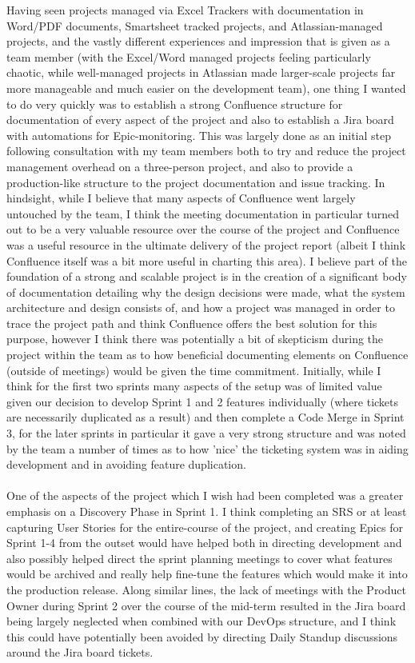 \documentclass{scrreprt}
\begin{document}
Having seen projects managed via Excel Trackers with documentation in Word/PDF documents, Smartsheet tracked projects, and Atlassian-managed projects, and the vastly different experiences and impression that is given as a team member (with the Excel/Word managed projects feeling particularly chaotic, while well-managed projects in Atlassian made larger-scale projects far more manageable and much easier on the development team), one thing I wanted to do very quickly was to establish a strong Confluence structure for documentation of every aspect of the project and also to establish a Jira board with automations for Epic-monitoring. This was largely done as an initial step following consultation with my team members both to try and reduce the project management overhead on a three-person project, and also to provide a production-like structure to the project documentation and issue tracking. In hindsight, while I believe that many aspects of Confluence went largely untouched by the team, I think the meeting documentation in particular turned out to be a very valuable resource over the course of the project and Confluence was a useful resource in the ultimate delivery of the project report (albeit I think Confluence itself was a bit more useful in charting this area). I believe part of the foundation of a strong and scalable project is in the creation of a significant body of documentation detailing why the design decisions were made, what the system architecture and design consists of, and how a project was managed in order to trace the project path and think Confluence offers the best solution for this purpose, however I think there was potentially a bit of skepticism during the project within the team as to how beneficial documenting elements on Confluence (outside of meetings) would be given the time commitment. Initially, while I think for the first two sprints many aspects of the setup was of limited value given our decision to develop Sprint 1 and 2 features individually (where tickets are necessarily duplicated as a result) and then complete a Code Merge in Sprint 3, for the later sprints in particular it gave a very strong structure and was noted by the team a number of times as to how 'nice' the ticketing system was in aiding development and in avoiding feature duplication.\\
\\
One of the aspects of the project which I wish had been completed was a greater emphasis on a Discovery Phase in Sprint 1. I think completing an SRS or at least capturing User Stories for the entire-course of the project, and creating Epics for Sprint 1-4 from the outset would have helped both in directing development and also possibly helped direct the sprint planning meetings to cover what features would be archived and really help fine-tune the features which would make it into the production release. Along similar lines, the lack of meetings with the Product Owner during Sprint 2 over the course of the mid-term resulted in the Jira board being largely neglected when combined with our DevOps structure, and I think this could have potentially been avoided by directing Daily Standup discussions around the Jira board tickets.\\
\end{document}
